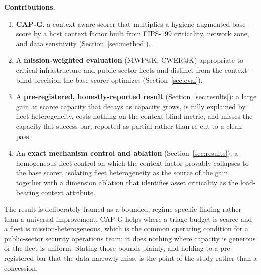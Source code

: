 \noindent\textbf{Contributions.}
\begin{enumerate}
\item \textbf{CAP-G}, a context-aware scorer that multiplies a hygiene-augmented base score by
a host context factor built from FIPS-199 criticality, network zone, and data sensitivity
(Section~\ref{sec:method}).
\item A \textbf{mission-weighted evaluation} (MWP@K, CWER@K) appropriate to
critical-infrastructure and public-sector fleets
and distinct from the context-blind precision the base scorer optimizes
(Section~\ref{sec:eval}).
\item A \textbf{pre-registered, honestly-reported result} (Section~\ref{sec:results}): a large
gain at scarce capacity that decays as capacity grows, is fully explained by fleet
heterogeneity, costs nothing on the context-blind metric, and misses the capacity-flat success
bar, reported as partial rather than re-cut to a clean pass.
\item An \textbf{exact mechanism control and ablation} (Section~\ref{sec:results}): a
homogeneous-fleet control on which the context factor provably collapses to the base scorer,
isolating fleet heterogeneity as the source of the gain, together with a dimension ablation that
identifies asset criticality as the load-bearing context attribute.
\end{enumerate}

The result is deliberately framed as a bounded, regime-specific finding rather than a universal
improvement. CAP-G helps where a triage budget is scarce and a fleet is mission-heterogeneous,
which is the common operating condition for a public-sector security operations team; it does
nothing where capacity is generous or the fleet is uniform. Stating those bounds plainly, and
holding to a pre-registered bar that the data narrowly miss, is the point of the study rather
than a concession.
